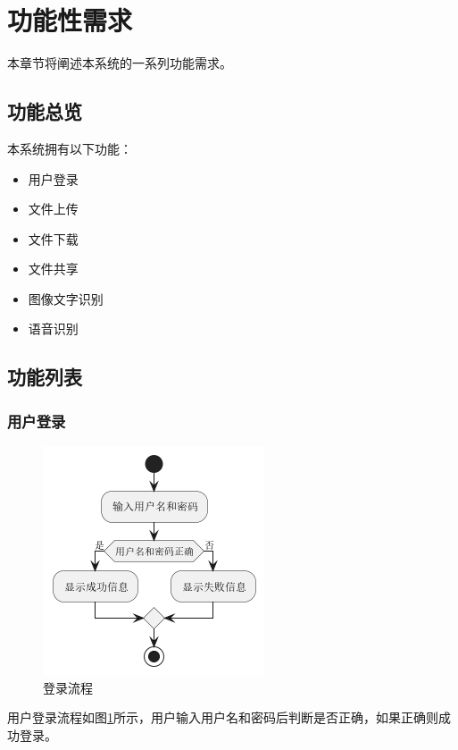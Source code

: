 \section{功能性需求}

本章节将阐述本系统的一系列功能需求。

\subsection{功能总览}

本系统拥有以下功能：
\begin{itemize}
    \item 用户登录
    \item 文件上传
    \item 文件下载
    \item 文件共享
    \item 图像文字识别
    \item 语音识别
\end{itemize}

\subsection{功能列表}

\subsubsection{用户登录}

\begin{figure}[H]
    \begin{center}
        \includegraphics[scale=0.6]{examples/登录流程图.png}
        \caption{登录流程}
        \label{fig:login}
    \end{center}
\end{figure}

用户登录流程如图\ref{fig:login}所示，用户输入用户名和密码后判断是否正确，如果正确则成功登录。

